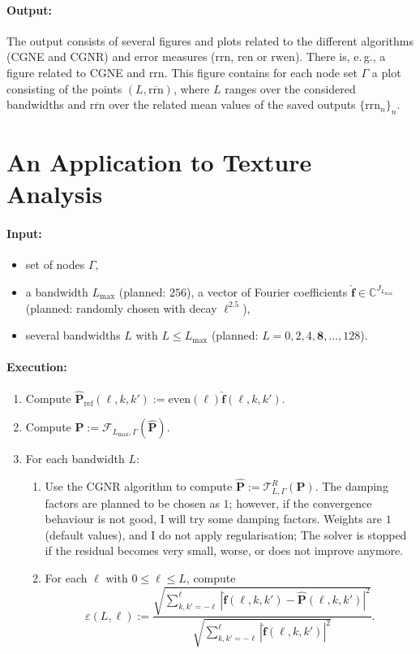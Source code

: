 \documentclass[a4paper,twoside,smallheadings,headsepline,11pt,final]{scrartcl}
\newcommand{\F}{\mathcal{F}}
\newcommand{\T}{\mathcal{T}}
\newcommand{\C}{\mathbb{C}}
\begin{document}
\paragraph*{Output:}
The output consists of several figures and plots related to the different algorithms (CGNE and CGNR) and error measures ($\mathrm{rrn}$, $\mathrm{ren}$ or $\mathrm{rwen}$).
There is, e.\,g., a figure related to CGNE and $\mathrm{rrn}$.
This figure contains for each node set $\Gamma$ a plot consisting of the points $(L, \overline{\mathrm{rrn}})$, where $L$ ranges over the considered bandwidths and $\overline{\mathrm{rrn}}$ over the related mean values of the saved outputs $\{\mathrm{rrn}_n\}_n$.

\section{An Application to Texture Analysis}

\paragraph*{Input:}
\begin{itemize}
\item set of nodes $\Gamma$,
\item a bandwidth $L_{\mathrm{max}}$ (planned: $256$), a vector of Fourier coefficients $\mathbf{\hat f} \in \C^{J_{L_{\mathrm{max}}}}$ (planned: randomly chosen with decay $\ell^{2.5}$),
\item several bandwidths $L$ with $L \leq L_{\mathrm{max}}$ (planned: $L = 0, 2, 4, \mathbf{8}, \dots, 128$).
\end{itemize}

\paragraph*{Execution:}
\begin{enumerate}
\item Compute $\mathbf{\hat P}_{\mathrm{ref}}(\ell, k, k') := \mathrm{even}(\ell) \mathbf{\hat f}(\ell, k, k')$.
\item Compute $\mathbf{P} := \F_{L_{\mathrm{max}}, \Gamma}(\mathbf{\hat P})$.
\item For each bandwidth $L$:
\begin{enumerate}
\item Use the CGNR algorithm to compute $\mathbf{\hat P} := \T_{L, \Gamma}^R(\mathbf{P})$.
The damping factors are planned to be chosen as $1$;
however, if the convergence behaviour is not good, I will try some damping factors.
Weights are $1$ (default values), and I do not apply regularisation;
The solver is stopped if the residual becomes very small, worse, or does not improve anymore.
\item For each $\ell$ with $0 \leq \ell \leq L$, compute
\[
\varepsilon(L, \ell) := 
\dfrac
{\sqrt{\sum_{k, k' = -\ell}^{\ell} |\mathbf{\hat f}(\ell, k, k') - \mathbf{\hat P}(\ell, k, k')|^2}}
{\sqrt{\sum_{k, k' = -\ell}^{\ell} |\mathbf{\hat f}(\ell, k, k')|^2}}.
\]
\end{enumerate}
\end{enumerate}
\end{document}
